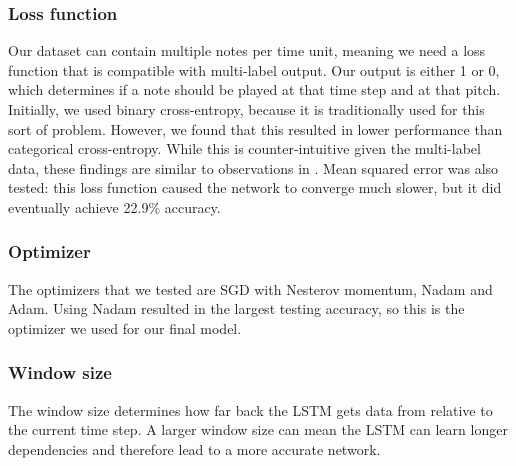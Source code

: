 \documentclass[11pt, twocolumn]{article}
\begin{document}
\subsubsection{Loss function}
Our dataset can contain multiple notes per time unit, meaning we need a loss function that is compatible with multi-label output. Our output is either 1 or 0, which determines if a note should be played at that time step and at that pitch.
Initially, we used binary cross-entropy, because it is traditionally used for this sort of problem. However, we found that this resulted in lower performance than categorical cross-entropy. While this is counter-intuitive given the multi-label data, these findings are similar to observations in \cite{Mahajan_2018_ECCV}. Mean squared error was also tested: this loss function caused the network to converge much slower, but it did eventually achieve 22.9\% accuracy.

\subsubsection{Optimizer}
The optimizers that we tested are SGD with Nesterov momentum, Nadam and Adam. Using Nadam resulted in the largest testing accuracy, so this is the optimizer we used for our final model.

\subsubsection{Window size}
The window size determines how far back the LSTM gets data from relative to the current time step. A larger window size can mean the LSTM can learn longer dependencies and therefore lead to a more accurate network.
\end{document}
